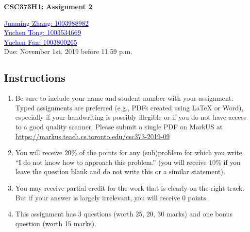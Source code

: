 \documentclass[10pt]{article}
\begin{document}
\begin{center}
\Large \textbf{CSC373H1: Assignment 2}

\vspace{1mm}
\large {\href{mailto:junmingpeter.zhang@mail.utoronto.ca?Subject=CSC373H1: Assignment 2}{\textcolor{blue}{Junming Zhang: 1003988982}}\\
\href{mailto:yuchen.tong@mail.utoronto.ca?Subject=CSC373H1: Assignment 2}{\textcolor{blue}{Yuchen Tong: 1003534669}}\\
\href{mailto:yuchen.fan@mail.utoronto.ca?Subject=CSC373H1: Assignment 2}{\textcolor{blue}{Yuchen Fan: 1003800265}}}\\

\vspace{1mm}
\large {Due: November 1st, 2019 before 11:59 p.m.}
\end{center}

\subsection*{Instructions}
\begin{enumerate}
    \item Be sure to include your name and student number with your assignment. Typed assignments are preferred (e.g., PDFs created using LaTeX or Word), especially if your handwriting is possibly illegible or if you do not have access to a good quality scanner. Please submit a single PDF on MarkUS at \url{https://markus.teach.cs.toronto.edu/csc373-2019-09}
    \item You will receive $20\%$ of the points for any (sub)problem for which you write “I do not know how to approach this problem.” (you will receive $10\%$ if you leave the question blank and do not write this or a similar statement).
    \item You may receive partial credit for the work that is clearly on the right track. But if your answer is largely irrelevant, you will receive 0 points.
    \item This assignment has 3 questions (worth 25, 20, 30 marks) and one bonus question (worth 15 marks).
\end{enumerate}
\end{document}
